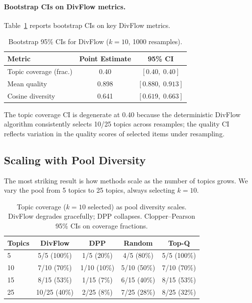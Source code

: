 \documentclass[10pt]{article}
\begin{document}
\paragraph{Bootstrap CIs on DivFlow metrics.}
Table~\ref{tab:bootstrap} reports bootstrap CIs on key DivFlow metrics.

\begin{table}[t]
\centering
\caption{Bootstrap 95\% CIs for DivFlow ($k{=}10$, 1000 resamples).}
\label{tab:bootstrap}
\begin{tabular}{lcc}
\toprule
\textbf{Metric} & \textbf{Point Estimate} & \textbf{95\% CI} \\
\midrule
Topic coverage (frac.)  & 0.40 & $[0.40,\; 0.40]$ \\
Mean quality            & 0.898 & $[0.880,\; 0.913]$ \\
Cosine diversity        & 0.641 & $[0.619,\; 0.663]$ \\
\bottomrule
\end{tabular}
\end{table}

The topic coverage CI is degenerate at 0.40 because the deterministic DivFlow algorithm consistently selects 10/25 topics across resamples; the quality CI reflects variation in the quality scores of selected items under resampling.

\subsection{Scaling with Pool Diversity}
\label{sec:scaling}

The most striking result is how methods scale as the number of topics grows.
We vary the pool from 5 topics to 25 topics, always selecting $k=10$.

\begin{table}[t]
\centering
\caption{Topic coverage ($k{=}10$ selected) as pool diversity scales.
DivFlow degrades gracefully; DPP collapses.
Clopper--Pearson 95\% CIs on coverage fractions.}
\label{tab:scaling}
\begin{tabular}{lcccc}
\toprule
\textbf{Topics} & \textbf{DivFlow} & \textbf{DPP} & \textbf{Random} & \textbf{Top-Q} \\
\midrule
5  & 5/5\; (100\%) & 1/5\; (20\%) & 4/5\; (80\%) & 5/5\; (100\%) \\
10 & 7/10\; (70\%) & 1/10\; (10\%) & 5/10\; (50\%) & 7/10\; (70\%) \\
15 & 8/15\; (53\%) & 1/15\; (7\%) & 6/15\; (40\%) & 8/15\; (53\%) \\
25 & 10/25\; (40\%) & 2/25\; (8\%) & 7/25\; (28\%) & 8/25\; (32\%) \\
\bottomrule
\end{tabular}
\end{table}
\end{document}
